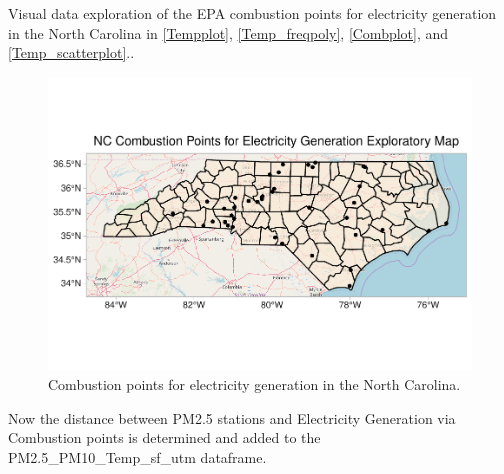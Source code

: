 \documentclass[12pt,]{article}
\begin{document}
Visual data exploration of the EPA combustion points for electricity
generation in the North Carolina in \autoref{Tempplot},
\autoref{Temp_freqpoly}, \autoref{Combplot}, and
\autoref{Temp_scatterplot}..

\begin{figure}
\centering
\includegraphics{Raby_ENV872_Project_files/figure-latex/unnamed-chunk-36-1.pdf}
\caption{Combustion points for electricity generation in the North
Carolina. \label{Combplot}}
\end{figure}

Now the distance between PM2.5 stations and Electricity Generation via
Combustion points is determined and added to the
PM2.5\_PM10\_Temp\_sf\_utm dataframe.
\end{document}
